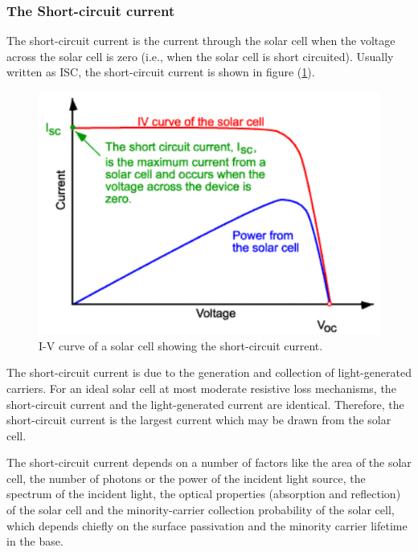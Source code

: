 \documentclass[%
 aip,
 amsmath,amssymb,
 reprint, floatfix%
]{revtex4-2}
\begin{document}
    \subsubsection{The Short-circuit current}
        The short-circuit current is the current through the solar cell when the voltage across the solar cell is zero (i.e., when the solar cell is short circuited). Usually written as ISC, the short-circuit current is shown in figure (\ref{fig:short}).
        \begin{figure}
            \centering
            \includegraphics[scale = 0.65]{Figures/short-circuit.png}
            \caption{I-V curve of a solar cell showing the short-circuit current.}
            \label{fig:short}
        \end{figure}
        The short-circuit current is due to the generation and collection of light-generated carriers. For an ideal solar cell at most moderate resistive loss mechanisms, the short-circuit current and the light-generated current are identical. Therefore, the short-circuit current is the largest current which may be drawn from the solar cell.
        \par
        The short-circuit current depends on a number of factors like the area of the solar cell, the number of photons or the power of the incident light source, the spectrum of the incident light, the optical properties (absorption and reflection) of the solar cell and the minority-carrier collection probability of the solar cell, which depends chiefly on the surface passivation and the minority carrier lifetime in the base.
\end{document}
